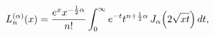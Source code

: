 \[\mathop{L^{(\alpha)}_{n}\/}\nolimits\!\left(x\right)=\frac{e^{x}x^{-\frac{1}{2%
}\alpha}}{n!}\int_{0}^{\infty}e^{-t}t^{n+\frac{1}{2}\alpha}\mathop{J_{\alpha}%
\/}\nolimits\!\left(2\sqrt{xt}\right)dt,\]
